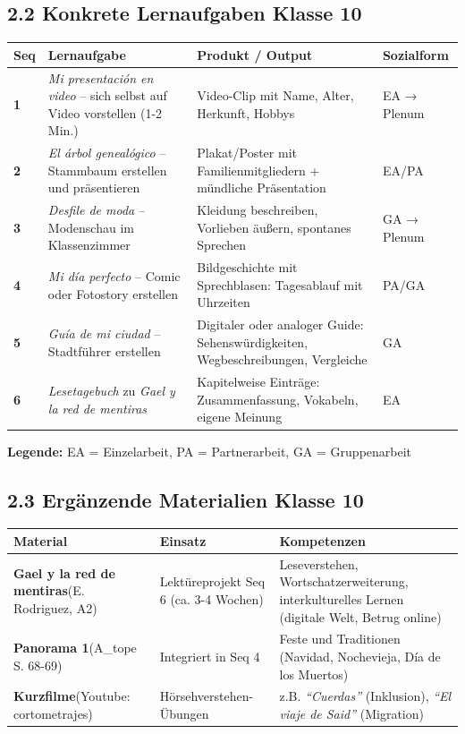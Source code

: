 \documentclass[11pt, a4paper]{article}
\newcommand{\es}[1]{\textit{#1}}
\begin{document}
\subsection*{2.2 Konkrete Lernaufgaben Klasse 10}

\begin{tabularx}{\textwidth}{|C{0.8cm}|L{4cm}|X|C{2cm}|}
\hline
{}
\textbf{Seq} & \textbf{Lernaufgabe} & \textbf{Produkt / Output} & \textbf{Sozialform} \\
\hline
\textbf{1} & \es{Mi presentación en video} -- sich selbst auf Video vorstellen (1-2 Min.) &
Video-Clip mit Name, Alter, Herkunft, Hobbys &
EA → Plenum \\
\hline
\textbf{2} & \es{El árbol genealógico} -- Stammbaum erstellen und präsentieren &
Plakat/Poster mit Familienmitgliedern + mündliche Präsentation &
EA/PA \\
\hline
\textbf{3} & \es{Desfile de moda} -- Modenschau im Klassenzimmer &
Kleidung beschreiben, Vorlieben äußern, spontanes Sprechen &
GA → Plenum \\
\hline
\textbf{4} & \es{Mi día perfecto} -- Comic oder Fotostory erstellen &
Bildgeschichte mit Sprechblasen: Tagesablauf mit Uhrzeiten &
PA/GA \\
\hline
\textbf{5} & \es{Guía de mi ciudad} -- Stadtführer erstellen &
Digitaler oder analoger Guide: Sehenswürdigkeiten, Wegbeschreibungen, Vergleiche &
GA \\
\hline
\textbf{6} & \es{Lesetagebuch} zu \textit{Gael y la red de mentiras} &
Kapitelweise Einträge: Zusammenfassung, Vokabeln, eigene Meinung &
EA \\
\hline
\end{tabularx}

\vspace{6pt}
{\footnotesize \textbf{Legende:} EA = Einzelarbeit, PA = Partnerarbeit, GA = Gruppenarbeit}

\subsection*{2.3 Ergänzende Materialien Klasse 10}

\begin{tabularx}{\textwidth}{|L{3cm}|L{4cm}|X|}
\hline
{}
\textbf{Material} & \textbf{Einsatz} & \textbf{Kompetenzen} \\
\hline
\textbf{Gael y la red de mentiras}\newline (E. Rodriguez, A2) &
Lektüreprojekt Seq 6 (ca. 3-4 Wochen) &
Leseverstehen, Wortschatzerweiterung, interkulturelles Lernen (digitale Welt, Betrug online) \\
\hline
\textbf{Panorama 1}\newline (A\_tope S. 68-69) &
Integriert in Seq 4 &
Feste und Traditionen (Navidad, Nochevieja, Día de los Muertos) \\
\hline
\textbf{Kurzfilme}\newline (Youtube: cortometrajes) &
Hörsehverstehen-Übungen &
z.B. \es{``Cuerdas''} (Inklusion), \es{``El viaje de Said''} (Migration) \\
\hline
\end{tabularx}
\end{document}
